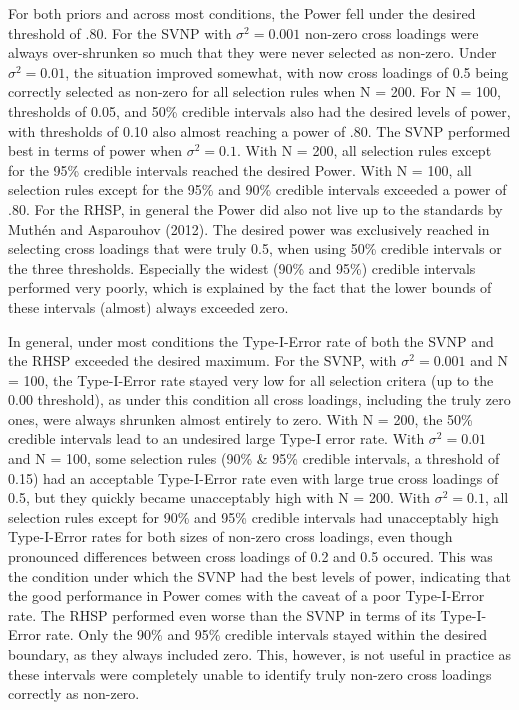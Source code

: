 \documentclass[
  man, donotrepeattitle,floatsintext]{apa6}
\begin{document}
For both priors and across most conditions, the Power fell under the
desired threshold of .80. For the SVNP with \(\sigma^2 = 0.001\) non-zero
cross loadings were always over-shrunken so much that they were never
selected as non-zero. Under \(\sigma^2 = 0.01\), the situation improved
somewhat, with now cross loadings of 0.5 being correctly selected as
non-zero for all selection rules when N = 200. For N = 100, thresholds
of 0.05, and 50\% credible intervals also had the desired levels of
power, with thresholds of 0.10 also almost reaching a power of .80. The
SVNP performed best in terms of power when \(\sigma^2 = 0.1\). With N =
200, all selection rules except for the 95\% credible intervals reached
the desired Power. With N = 100, all selection rules except for the 95\%
and 90\% credible intervals exceeded a power of .80. For the RHSP, in
general the Power did also not live up to the standards by
Muthén and Asparouhov (2012). The desired power was exclusively reached in
selecting cross loadings that were truly 0.5, when using 50\% credible
intervals or the three thresholds. Especially the widest (90\% and 95\%)
credible intervals performed very poorly, which is explained by the fact
that the lower bounds of these intervals (almost) always exceeded zero.

In general, under most conditions the Type-I-Error rate of both the SVNP
and the RHSP exceeded the desired maximum. For the SVNP, with
\(\sigma^2 = 0.001\) and N = 100, the Type-I-Error rate stayed very low
for all selection critera (up to the 0.00 threshold), as under this
condition all cross loadings, including the truly zero ones, were always
shrunken almost entirely to zero. With N = 200, the 50\% credible
intervals lead to an undesired large Type-I error rate. With
\(\sigma^2 = 0.01\) and N = 100, some selection rules (90\% \& 95\% credible
intervals, a threshold of 0.15) had an acceptable Type-I-Error rate even
with large true cross loadings of 0.5, but they quickly became
unacceptably high with N = 200. With \(\sigma^2 = 0.1\), all selection
rules except for 90\% and 95\% credible intervals had unacceptably high
Type-I-Error rates for both sizes of non-zero cross loadings, even
though pronounced differences between cross loadings of 0.2 and 0.5
occured. This was the condition under which the SVNP had the best levels
of power, indicating that the good performance in Power comes with the
caveat of a poor Type-I-Error rate. The RHSP performed even worse than
the SVNP in terms of its Type-I-Error rate. Only the 90\% and 95\%
credible intervals stayed within the desired boundary, as they always
included zero. This, however, is not useful in practice as these
intervals were completely unable to identify truly non-zero cross
loadings correctly as non-zero.
\end{document}
